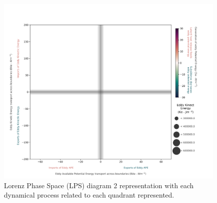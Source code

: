 \begin{figure}[!htbp]
\centering
\includegraphics[width=\textwidth]{figs_6/lps_example_imports.png}
\caption[LPS 2 - Dynamical Processes]{Lorenz Phase Space (LPS) diagram 2 representation with each dynamical process related to each quadrant represented.}
\label{fig:lps_example_imports}
\end{figure}
